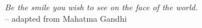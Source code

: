 
\thispagestyle{empty}

\begin{figure}[p!]
\hfill \begin{minipage}[c]{.7\textwidth}
\begin{flushright}
\textit{Be the smile 
you wish to see on the face of the world.}
\\[1em]
-- adapted from Mahatma Gandhi\\
\end{flushright}
\end{minipage}
\end{figure}

\clearpage